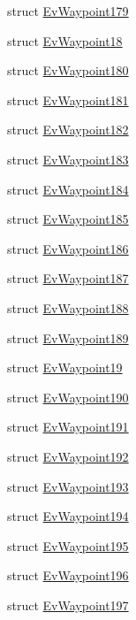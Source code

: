 \begin{DoxyCompactItemize}
struct \hyperlink{structcl__move__base__z_1_1EvWaypoint179}{Ev\+Waypoint179}
\item 
struct \hyperlink{structcl__move__base__z_1_1EvWaypoint18}{Ev\+Waypoint18}
\item 
struct \hyperlink{structcl__move__base__z_1_1EvWaypoint180}{Ev\+Waypoint180}
\item 
struct \hyperlink{structcl__move__base__z_1_1EvWaypoint181}{Ev\+Waypoint181}
\item 
struct \hyperlink{structcl__move__base__z_1_1EvWaypoint182}{Ev\+Waypoint182}
\item 
struct \hyperlink{structcl__move__base__z_1_1EvWaypoint183}{Ev\+Waypoint183}
\item 
struct \hyperlink{structcl__move__base__z_1_1EvWaypoint184}{Ev\+Waypoint184}
\item 
struct \hyperlink{structcl__move__base__z_1_1EvWaypoint185}{Ev\+Waypoint185}
\item 
struct \hyperlink{structcl__move__base__z_1_1EvWaypoint186}{Ev\+Waypoint186}
\item 
struct \hyperlink{structcl__move__base__z_1_1EvWaypoint187}{Ev\+Waypoint187}
\item 
struct \hyperlink{structcl__move__base__z_1_1EvWaypoint188}{Ev\+Waypoint188}
\item 
struct \hyperlink{structcl__move__base__z_1_1EvWaypoint189}{Ev\+Waypoint189}
\item 
struct \hyperlink{structcl__move__base__z_1_1EvWaypoint19}{Ev\+Waypoint19}
\item 
struct \hyperlink{structcl__move__base__z_1_1EvWaypoint190}{Ev\+Waypoint190}
\item 
struct \hyperlink{structcl__move__base__z_1_1EvWaypoint191}{Ev\+Waypoint191}
\item 
struct \hyperlink{structcl__move__base__z_1_1EvWaypoint192}{Ev\+Waypoint192}
\item 
struct \hyperlink{structcl__move__base__z_1_1EvWaypoint193}{Ev\+Waypoint193}
\item 
struct \hyperlink{structcl__move__base__z_1_1EvWaypoint194}{Ev\+Waypoint194}
\item 
struct \hyperlink{structcl__move__base__z_1_1EvWaypoint195}{Ev\+Waypoint195}
\item 
struct \hyperlink{structcl__move__base__z_1_1EvWaypoint196}{Ev\+Waypoint196}
\item 
struct \hyperlink{structcl__move__base__z_1_1EvWaypoint197}{Ev\+Waypoint197}
\item 

\end{DoxyCompactItemize}
